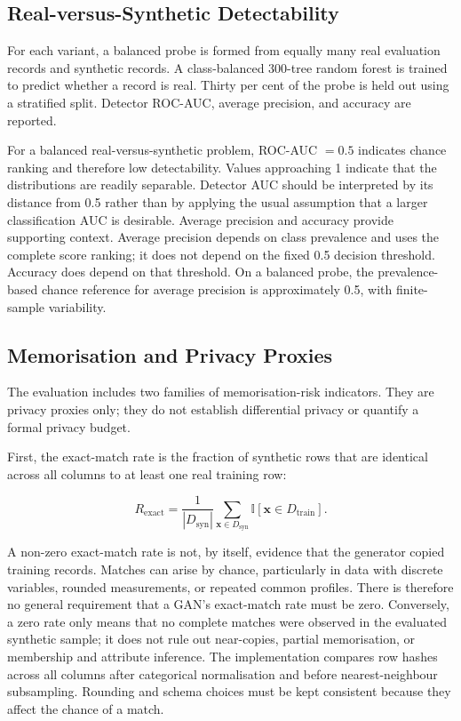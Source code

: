 \subsection{Real-versus-Synthetic Detectability}
\label{subsec:evaluation_detectability}

For each variant, a balanced probe is formed from equally many real evaluation
records and synthetic records. A class-balanced 300-tree random forest is
trained to predict whether a record is real. Thirty per cent of the probe is
held out using a stratified split. Detector ROC-AUC, average precision, and
accuracy are reported.

For a balanced real-versus-synthetic problem, ROC-AUC $=0.5$ indicates chance
ranking and therefore low detectability. Values approaching 1 indicate that
the distributions are readily separable. Detector AUC should be interpreted by
its distance from 0.5 rather than by applying the usual assumption that a
larger classification AUC is desirable. Average precision and accuracy provide
supporting context. Average precision depends on class prevalence and uses
the complete score ranking; it does not depend on the fixed 0.5 decision
threshold. Accuracy does depend on that threshold. On a balanced probe,
the prevalence-based chance reference for average precision is approximately
0.5, with finite-sample variability.

\subsection{Memorisation and Privacy Proxies}
\label{subsec:privacy_proxies}

The evaluation includes two families of memorisation-risk indicators. They are
privacy proxies only; they do not establish differential privacy or quantify a
formal privacy budget.

First, the exact-match rate is the fraction of synthetic rows that are
identical across all columns to at least one real training row:

\begin{equation}
    R_{\mathrm{exact}} = \frac{1}{|D_{\mathrm{syn}}|}
        \sum_{\mathbf{x}\in D_{\mathrm{syn}}}
        \mathbb{I}[\mathbf{x}\in D_{\mathrm{train}}].
    \label{eq:evaluation_exact_match}
\end{equation}

A non-zero exact-match rate is not, by itself, evidence that the generator
copied training records. Matches can arise by chance, particularly in data
with discrete variables, rounded measurements, or repeated common profiles.
There is therefore no general requirement that a GAN's exact-match rate must
be zero. Conversely, a zero rate only means that no complete matches were
observed in the evaluated synthetic sample; it does not rule out near-copies,
partial memorisation, or membership and attribute inference. The
implementation compares row hashes across all columns after categorical
normalisation and before nearest-neighbour subsampling. Rounding and schema
choices must be kept consistent because they affect the chance of a match.

